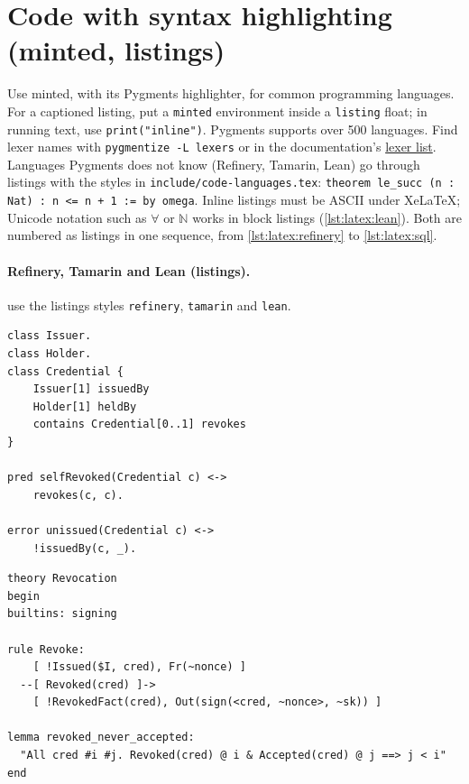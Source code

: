 \section{Code with syntax highlighting (minted, listings)}\label{app:latex:code}
Use minted, with its Pygments highlighter, for common programming languages.
For a captioned listing, put a \texttt{minted} environment inside a \texttt{listing} float; in running text, use \texttt{print("inline")}.
Pygments supports over 500 languages. Find lexer names with \texttt{pygmentize -L lexers} or in the documentation's \href{https://pygments.org/docs/lexers/}{lexer list}.
Languages Pygments does not know (Refinery, Tamarin, Lean) go through listings with the styles in \texttt{include/code-languages.tex}: \lstinline[style=lean]{theorem le_succ (n : Nat) : n <= n + 1 := by omega}.
Inline listings must be ASCII under XeLaTeX; Unicode notation such as $\forall$ or $\mathbb{N}$ works in block listings (\cref{lst:latex:lean}).
Both are numbered as listings in one sequence, from \cref{lst:latex:refinery} to \cref{lst:latex:sql}.

\paragraph{Refinery, Tamarin and Lean (listings).}
 use the listings styles \texttt{refinery}, \texttt{tamarin} and \texttt{lean}.
\begin{lstlisting}[style=refinery, float=tbp, morekeywords={[2]Credential,Issuer,Holder}, caption={Refinery: a credential metamodel with an error predicate.}, label={lst:latex:refinery}]
class Issuer.
class Holder.
class Credential {
    Issuer[1] issuedBy
    Holder[1] heldBy
    contains Credential[0..1] revokes
}

pred selfRevoked(Credential c) <->
    revokes(c, c).

error unissued(Credential c) <->
    !issuedBy(c, _).
\end{lstlisting}

\begin{lstlisting}[style=tamarin, float=tbp, caption={Tamarin: revocation as a multiset-rewriting rule and a lemma.}, label={lst:latex:tamarin}]
theory Revocation
begin
builtins: signing

rule Revoke:
    [ !Issued($I, cred), Fr(~nonce) ]
  --[ Revoked(cred) ]->
    [ !RevokedFact(cred), Out(sign(<cred, ~nonce>, ~sk)) ]

lemma revoked_never_accepted:
  "All cred #i #j. Revoked(cred) @ i & Accepted(cred) @ j ==> j < i"
end
\end{lstlisting}

